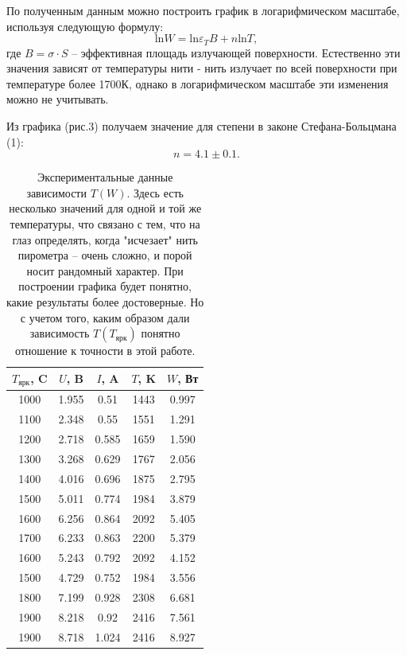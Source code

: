 \documentclass[a4paper, 14pt]{extarticle}%
\newcommand\ECaption[1]{%
     \captionsetup{font=footnotesize}%
     \caption{#1}}
\begin{document}
По полученным данным можно построить график в логарифмическом масштабе, используя следующую формулу:
\begin{equation}
\text{ln}W = \text{ln}\varepsilon_T B + n\text{ln}T,
\end{equation}
где $B = \sigma \cdot S$ -- эффективная площадь излучающей поверхности. Естественно эти значения зависят от температуры нити - нить излучает по всей поверхности при температуре более 1700К, однако в логарифмическом масштабе эти изменения можно не учитывать.


Из графика (рис.3) получаем значение для степени в законе Стефана-Больцмана (1):
\[n = 4.1 \pm 0.1.\]




\begin{table}[!h]
\begin{center}
\begin{tabular}{|c|c|c|c|c|}
\hline
\rowcolor[HTML]{9698ED} 
$T_{\text{ярк}}$, C & $U$, B & $I$, A & $T$, K & $W$, Вт \\ \hline
1000                & 1.955  & 0.51   & 1443   & 0.997   \\ \hline
\rowcolor[HTML]{9698ED} 
1100                & 2.348  & 0.55   & 1551   & 1.291   \\ \hline
1200                & 2.718  & 0.585  & 1659   & 1.590   \\ \hline
\rowcolor[HTML]{9698ED} 
1300                & 3.268  & 0.629  & 1767   & 2.056   \\ \hline
1400                & 4.016  & 0.696  & 1875   & 2.795   \\ \hline
\rowcolor[HTML]{9698ED} 
1500                & 5.011  & 0.774  & 1984   & 3.879   \\ \hline
1600                & 6.256  & 0.864  & 2092   & 5.405   \\ \hline
\rowcolor[HTML]{9698ED} 
1700                & 6.233  & 0.863  & 2200   & 5.379   \\ \hline
1600                & 5.243  & 0.792  & 2092   & 4.152   \\ \hline
\rowcolor[HTML]{9698ED} 
1500                & 4.729  & 0.752  & 1984   & 3.556   \\ \hline
1800                & 7.199  & 0.928  & 2308   & 6.681   \\ \hline
\rowcolor[HTML]{9698ED} 
1900                & 8.218  & 0.92   & 2416   & 7.561   \\ \hline
1900                & 8.718  & 1.024  & 2416   & 8.927   \\ \hline
\end{tabular}
\ECaption{Экспериментальные данные зависимости $T(W)$. Здесь есть несколько значений для одной и той же температуры, что связано с тем, что на глаз определять, когда "исчезает" нить пирометра -- очень сложно, и порой носит рандомный характер. При построении графика будет понятно, какие результаты более достоверные. Но с учетом того, каким образом дали зависимость $T(T_{\text{ярк}})$ понятно отношение к точности в этой работе.}
\end{center}
\end{table}
\end{document}
